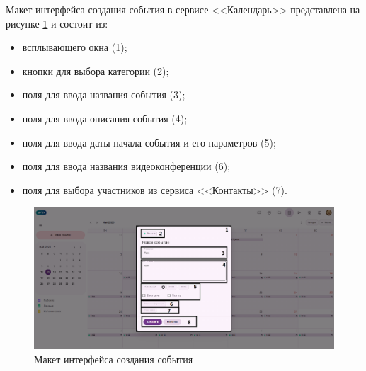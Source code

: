 Макет интерфейса создания события в сервисе <<Календарь>> представлена на рисунке \ref{templ:image3b} и состоит из:
\begin{itemize}
  \item всплывающего окна (1);
  \item кнопки для выбора категории (2);
  \item поля для ввода названия события (3);
  \item поля для ввода описания события (4);
  \item поля для ввода даты начала события и его параметров (5);
  \item поля для ввода названия видеоконференции (6);
  \item поля для выбора участников из сервиса <<Контакты>> (7).
\end{itemize}
\begin{figure}[H]
	\centering
	\includegraphics[width=1\linewidth]{images/календарь2}
	\caption{Макет интерфейса создания события}
	\label{templ:image3b}
\end{figure}

